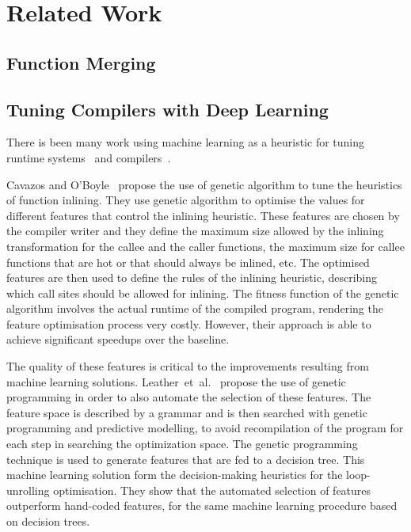 
\section{Related Work}

\subsection{Function Merging}



\subsection{Tuning Compilers with Deep Learning}

There is been many work using machine learning as a heuristic for tuning runtime systems~\cite{andreasson02,wang09,castro11,rocha17,pereira17} and compilers~\cite{cavazos05,leather09,cummins17,wang18,mendis19}.

Cavazos and O'Boyle~\cite{cavazos05} propose the use of genetic algorithm to tune the heuristics of function inlining.
They use genetic algorithm to optimise the values for different features that control the inlining heuristic.
These features are chosen by the compiler writer and they define the maximum size allowed by the inlining transformation for the callee and the caller functions, the maximum size for callee functions that are hot or that should always be inlined, etc.
The optimised features are then used to define the rules of the inlining heuristic, describing which call sites should be allowed for inlining.
The fitness function of the genetic algorithm involves the actual runtime of the compiled program, rendering the feature optimisation process very costly.
However, their approach is able to achieve significant speedups over the baseline.

The quality of these features is critical to the improvements resulting from machine learning solutions.
Leather~et~al.~\cite{leather09} propose the use of genetic programming in order to also automate the selection of these features.
The feature space is described by a grammar and is then searched with genetic programming and predictive modelling, to avoid recompilation of the program for each step in searching the optimization space.
The genetic programming technique is used to generate features that are fed to a decision tree.
This machine learning solution form the decision-making heuristics for the loop-unrolling optimisation.
They show that the automated selection of features outperform hand-coded features, for the same machine learning procedure based on decision trees.

